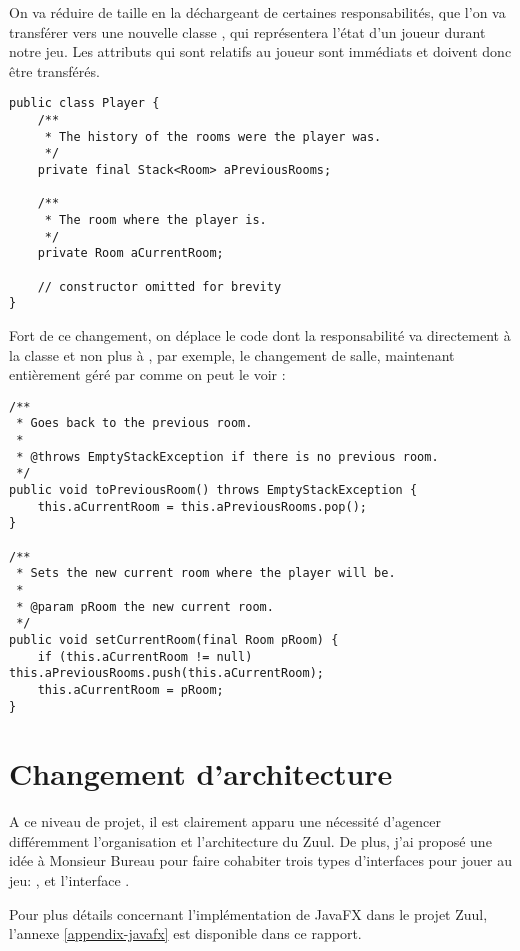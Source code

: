 \begin{exercise}[subtitle=Player]

On va réduire de taille  en la déchargeant de certaines responsabilités, que l'on va transférer vers une nouvelle classe , qui représentera l'état d'un joueur durant notre jeu. Les attributs qui sont relatifs au joueur sont immédiats et doivent donc être transférés.

\begin{verbatim}
public class Player {
    /**
     * The history of the rooms were the player was.
     */
    private final Stack<Room> aPreviousRooms;

    /**
     * The room where the player is.
     */
    private Room aCurrentRoom;
    
    // constructor omitted for brevity
}
\end{verbatim}

Fort de ce changement, on déplace le code dont la responsabilité va directement à la classe  et non plus à , par exemple, le changement de salle, maintenant entièrement géré par  comme on peut le voir :

\begin{verbatim}
/**
 * Goes back to the previous room.
 *
 * @throws EmptyStackException if there is no previous room.
 */
public void toPreviousRoom() throws EmptyStackException {
    this.aCurrentRoom = this.aPreviousRooms.pop();
}

/**
 * Sets the new current room where the player will be.
 *
 * @param pRoom the new current room.
 */
public void setCurrentRoom(final Room pRoom) {
    if (this.aCurrentRoom != null) this.aPreviousRooms.push(this.aCurrentRoom);
    this.aCurrentRoom = pRoom;
}
\end{verbatim}
\end{exercise}

\section*{Changement d'architecture}

A ce niveau de projet, il est clairement apparu une nécessité d'agencer différemment l'organisation et l'architecture du Zuul. De plus, j'ai proposé une idée à Monsieur Bureau pour faire cohabiter trois types d'interfaces pour jouer au jeu: ,  et l'interface .

Pour plus détails concernant l'implémentation de JavaFX dans le projet Zuul, l'annexe \ref{appendix-javafx} est disponible dans ce rapport.

